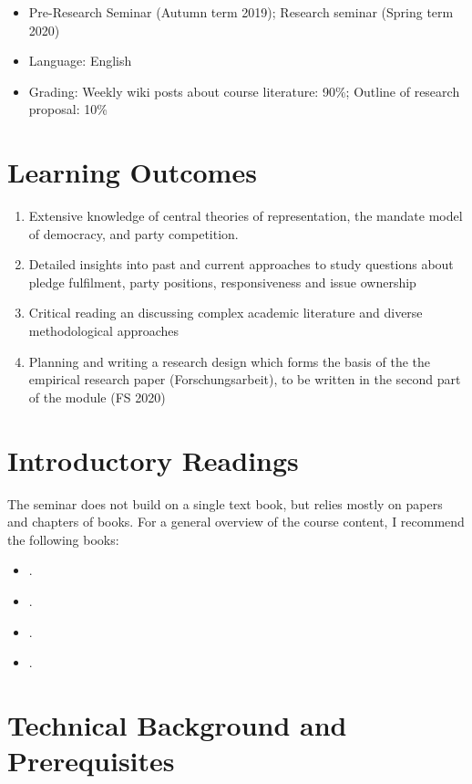 \documentclass[abstract=on,parskip=full,headings=standardclasses,fontsize=11pt,paper=a4]{scrartcl}
\begin{document}
\begin{itemize}
\item Pre-Research Seminar (Autumn term 2019); Research seminar (Spring term 2020)
\item  Language: English
\item Grading: Weekly wiki posts about course literature: 90\%;  Outline of research proposal: 10\%
\end{itemize}

\section*{Learning Outcomes}

\begin{enumerate}
\item Extensive knowledge of central theories of representation, the mandate model of democracy, and party competition. 
\item Detailed insights into past and current approaches to study questions about pledge fulfilment, party positions, responsiveness and issue ownership 
\item Critical reading an discussing  complex academic literature and diverse methodological approaches
\item Planning and writing a research design which forms the basis of the the empirical research paper (Forschungsarbeit), to be written in the second part of the module (FS 2020)
\end{enumerate}

\section*{Introductory Readings}

The seminar does not build on a single text book, but relies mostly on papers and chapters of books. For  a general overview of the course content, I recommend the following books:

\begin{itemize}
\item {}.
\item {}.
\item {}.
\item {}.
\end{itemize}


\section*{Technical Background and Prerequisites}
\end{document}
